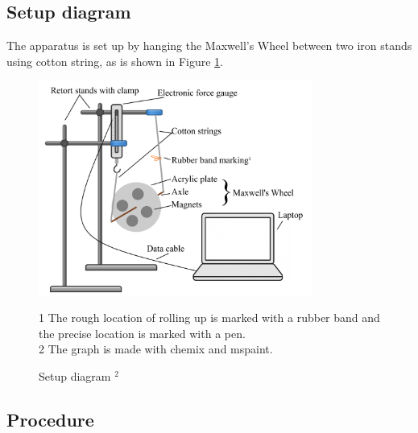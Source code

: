 \documentclass[a4paper]{article}
\begin{document}
\subsection{Setup diagram}

The apparatus is set up by hanging the Maxwell's Wheel between two iron stands using cotton string, as is shown in Figure \ref{fig.setup}.

\begin{figure}[ht]
    \centering
    \includegraphics[width = 0.8\textwidth]{setup.png}
    \caption{Setup diagram $^{2}$}
    \label{fig.setup}
    \begin{minipage}{0.8\textwidth}
    \begin{flushleft}
        \footnotesize{1 The rough location of rolling up is marked with a rubber band and the precise location is marked with a pen.} \\
        \footnotesize{2 The graph is made with chemix and mspaint.}
    \end{flushleft}
    \end{minipage}
    
\end{figure}

\subsection{Procedure}
\end{document}
